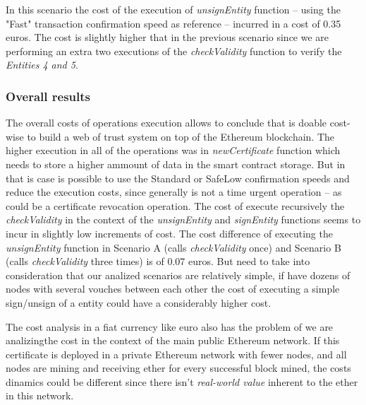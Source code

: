 In this scenario the cost of the execution of \textit{unsignEntity} function – using the "Fast" transaction confirmation speed as reference – incurred in a cost of 0.35 euros.
The cost is slightly higher that in the previous scenario since we are performing an extra two executions of the \textit{checkValidity} function to verify the \textit{Entities 4 and 5}.

\subsubsection{Overall results}

The overall costs of operations execution allows to conclude that is doable cost-wise to build a web of trust system on top of the Ethereum blockchain.
The higher execution in all of the operations was in \textit{newCertificate} function which needs to store a higher ammount of data in the smart contract storage. But in that is case is possible to use the Standard or SafeLow confirmation speeds and reduce the execution costs, since generally is not a time urgent operation – as could be a certificate revocation operation.
The cost of execute recursively the \textit{checkValidity} in the context of the \textit{unsignEntity} and \textit{signEntity} functions seems to incur in slightly low increments of cost. The cost difference of executing the \textit{unsignEntity} function in Scenario A (calls \textit{checkValidity} once) and Scenario B (calls \textit{checkValidity} three times) is of 0.07 euros. But need to take into consideration that our analized scenarios are relatively simple, if have dozens of nodes with several vouches between each other the cost of executing a simple sign/unsign of a entity could have a considerably higher cost.

The cost analysis in a fiat currency like euro also has the problem of we are analizingthe cost in the context of the main public Ethereum network.
If this certificate is deployed in a private Ethereum network with fewer nodes, and all nodes are mining and receiving ether for every successful block mined, the costs dinamics could be different since there isn't \textit{real-world value} inherent to the ether in this network.
